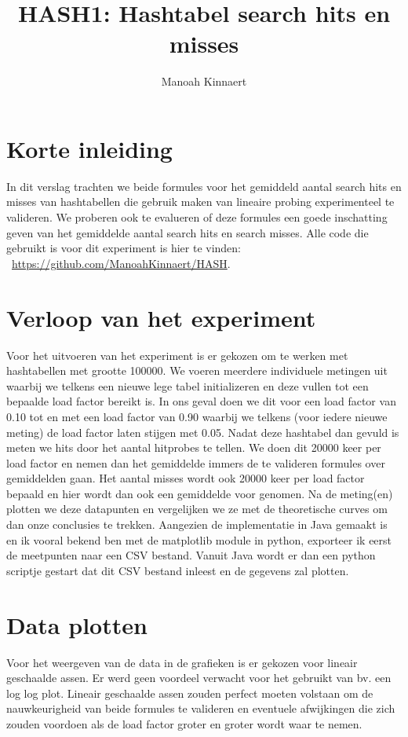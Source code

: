 \documentclass[12pt, dutch]{article}
\title{HASH1: Hashtabel search hits en misses}
\author{Manoah Kinnaert}
\begin{document}
\begin{titlepage}
    \maketitle
\end{titlepage}
\pagebreak
\section{Korte inleiding}
In dit verslag trachten we beide formules voor het gemiddeld aantal search hits en misses van hashtabellen die gebruik
maken van lineaire probing experimenteel te valideren. We proberen ook te evalueren of deze formules een goede inschatting geven van het gemiddelde aantal search hits en search misses.
Alle code die gebruikt is voor dit experiment is hier te vinden: \\\ 
\url{https://github.com/ManoahKinnaert/HASH}.

\section{Verloop van het experiment}
Voor het uitvoeren van het experiment is er gekozen om te werken met hashtabellen met grootte 100000. We voeren meerdere individuele metingen uit 
waarbij we telkens een nieuwe lege tabel initializeren en deze vullen tot een bepaalde load factor bereikt is. In ons geval doen we dit voor een load factor van 0.10 tot en met 
een load factor van 0.90 waarbij we telkens (voor iedere nieuwe meting) de load factor laten stijgen met 0.05. Nadat deze hashtabel dan gevuld is meten we hits door het aantal hitprobes te tellen.
We doen dit 20000 keer per load factor en nemen dan het gemiddelde immers de te valideren formules over gemiddelden gaan. Het aantal misses wordt ook 20000 keer per load factor bepaald en hier wordt dan ook een gemiddelde voor genomen.
Na de meting(en) plotten we deze datapunten en vergelijken we ze met de theoretische curves om dan onze conclusies te trekken. Aangezien de implementatie in Java gemaakt is en ik 
vooral bekend ben met de matplotlib module in python, exporteer ik eerst de meetpunten naar een CSV bestand. Vanuit Java wordt er dan een python scriptje gestart dat dit CSV bestand inleest en de gegevens zal plotten.

\section{Data plotten}
Voor het weergeven van de data in de grafieken is er gekozen voor lineair geschaalde assen. Er werd geen voordeel verwacht voor het gebruikt van bv. een log log plot.
Lineair geschaalde assen zouden perfect moeten volstaan om de nauwkeurigheid van beide formules te valideren en eventuele afwijkingen die zich zouden voordoen als de load factor groter en groter wordt waar te nemen.
\end{document}
